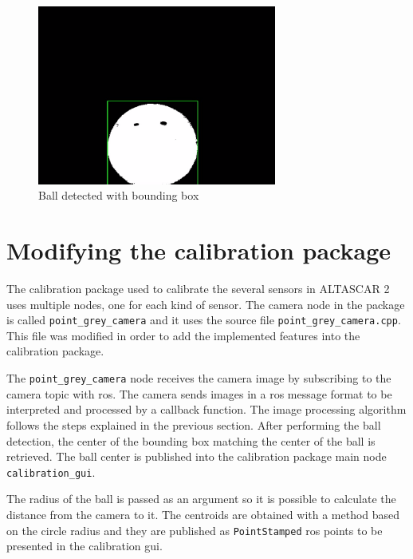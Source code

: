\begin{figure}[htp]
	
	\centering
	\includegraphics[width=0.7\textwidth]{capcalib/imgs/ball_detect.png}
	
	\caption{Ball detected with bounding box}
	\label{fig:balldetect}
	
\end{figure}

\section{Modifying the calibration package}

The calibration package used to calibrate the several sensors in ALTASCAR 2 uses multiple nodes, one for each kind of sensor. The camera node in the package is called \texttt{point\_grey\_camera} and it uses the source file \texttt{point\_grey\_camera.cpp}. This file was modified in order to add the implemented features into the calibration package. 

The \texttt{point\_grey\_camera} node receives the camera image by subscribing to the camera topic with \gls{ros}. The camera sends images in a \gls{ros} message format to be interpreted and processed by a callback function. The image processing algorithm follows the steps explained in the previous section. After performing the ball detection, the center of the bounding box matching the center of the ball is retrieved. The ball center is published into the calibration package main node \texttt{calibration\_gui}.

The radius of the ball is passed as an argument so it is possible to calculate the distance from the camera to it. The centroids are obtained with a method based on the circle radius and they are published as \texttt{PointStamped} \gls{ros} points to be presented in the calibration \gls{gui}. 















 

